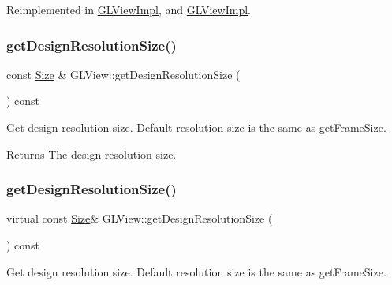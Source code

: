 Reimplemented in \hyperlink{classGLViewImpl_a475f5c382360141199bf110655941a22}{G\+L\+View\+Impl}, and \hyperlink{classGLViewImpl_a507c696f2d69451ca36ff787a996bf22}{G\+L\+View\+Impl}.

\mbox{\label{classGLView_a002c77306c0ee47cbf17c05bbfec3a7f}} 
\subsubsection{\texorpdfstring{get\+Design\+Resolution\+Size()}{getDesignResolutionSize()}\hspace{0.1cm}{\footnotesize\ttfamily [1/2]}}
{\footnotesize\ttfamily const \hyperlink{classSize}{Size} \& G\+L\+View\+::get\+Design\+Resolution\+Size (\begin{DoxyParamCaption}{ }\end{DoxyParamCaption}) const\hspace{0.3cm}{\ttfamily [virtual]}}

Get design resolution size. Default resolution size is the same as \textquotesingle{}get\+Frame\+Size\textquotesingle{}.

\begin{DoxyReturn}{Returns}
The design resolution size. 
\end{DoxyReturn}
\mbox{\label{classGLView_adcaede3f487202ed5fef44550274396a}} 
\subsubsection{\texorpdfstring{get\+Design\+Resolution\+Size()}{getDesignResolutionSize()}\hspace{0.1cm}{\footnotesize\ttfamily [2/2]}}
{\footnotesize\ttfamily virtual const \hyperlink{classSize}{Size}\& G\+L\+View\+::get\+Design\+Resolution\+Size (\begin{DoxyParamCaption}{ }\end{DoxyParamCaption}) const\hspace{0.3cm}{\ttfamily [virtual]}}

Get design resolution size. Default resolution size is the same as \textquotesingle{}get\+Frame\+Size\textquotesingle{}.


